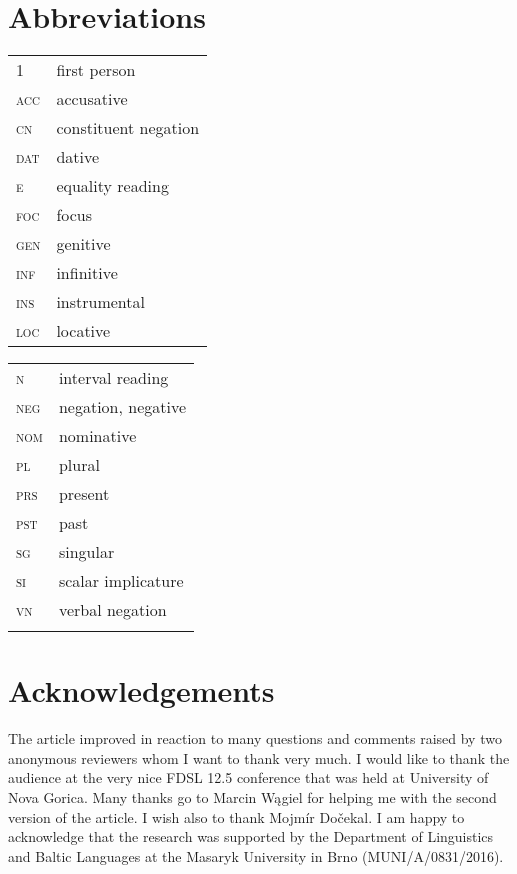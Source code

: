 \documentclass[output=paper, colorlinks, citecolor=brown, newtxmath]{langsci/langscibook}
\begin{document}
\section*{Abbreviations}

\begin{tabularx}{.48\textwidth}{lX}
\textsc{1}&first person\\
\textsc{acc}&{accusative}\\
\textsc{cn}&constituent {negation}\\
\textsc{dat}&{dative}\\
\textsc{e}&{equality reading}\\
\textsc{foc}&{focus}\\
\textsc{gen}&genitive\\
\textsc{inf}&{infinitive}\\
\textsc{ins}&instrumental\\
\textsc{loc}&locative\\
\end{tabularx}
\begin{tabularx}{.48\textwidth}{lX}
\textsc{n}&{interval reading}\\
\textsc{neg}&{negation}, negative\\
\textsc{nom}&nominative\\
\textsc{pl}&plural\\
\textsc{prs}&present\\
\textsc{pst}&past\\
\textsc{sg}&singular\\
\textsc{si}&{scalar implicature}\\
\textsc{vn}&{verbal negation}\\
&\\
\end{tabularx}

\section*{Acknowledgements}
The article improved in reaction to many questions and comments raised by two anonymous reviewers whom I want to thank very much. I would like to thank the audience at the very nice FDSL 12.5 conference that was held at University of Nova Gorica. Many thanks go to Marcin Wągiel for helping me with the second version of the article. I wish also to thank Mojmír Dočekal. I am happy to acknowledge that the research was supported by the Department of Linguistics and Baltic Languages at the Masaryk University in Brno (MUNI/A/0831/2016).



\sloppy
\printbibliography[heading=subbibliography,notkeyword=this]

\end{document}

